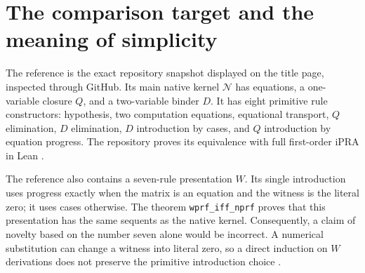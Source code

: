 \documentclass[11pt,a4paper]{article}
\theoremstyle{definition}
\begin{document}
\begin{abstract}
We replace the separate case and equation-induction introductions of the
current native scalar kernel by one introduction. At an equation matrix,
$Q_y E$ means $\forall y(E(y)\to E(Sy))$; at a compound matrix it keeps the
conditional reading $B(0)\to\forall y B(y)$. The corresponding $D$ binds an
existential witness. Elimination specializes a closure along
$I(a,n;u.Su)$, with the source placed in the counter position. Its zero
source computes directly to the arbitrary target $n$, which derives
contextual equation induction without a circular use of an iterator
identity. The new rules admit numerical substitution by direct induction.
Explicit translations preserve derivations in both directions and have
provably identity formula composites for the entire language, not only
guarded public formulas. Numerical domains remain whole and equality
remains actual equality. The written theorem is accompanied by a standalone
typed proof checker, matched old kernels, reproducible size measurements,
and positive and negative certificates. The new metatheorems are not
claimed to have been checked in Lean or Rocq.
\end{abstract}

{\small\tableofcontents}
\newpage
\section{The comparison target and the meaning of simplicity}

The reference is the exact repository snapshot displayed on the title
page, inspected through GitHub. Its main native kernel $\mathcal N$
has equations, a one-variable closure $Q$, and a two-variable binder $D$.
It has eight primitive rule constructors: hypothesis, two computation
equations, equational transport, $Q$ elimination, $D$ elimination,
$D$ introduction by cases, and $Q$ introduction by equation progress.
The repository proves its equivalence with full first-order iPRA in Lean
\cite{baseline,native,bridge}.

The reference also contains a seven-rule presentation $W$.
Its single introduction uses progress exactly when the matrix is an
equation and the witness is the literal zero; it uses cases otherwise.
The theorem \texttt{wprf\_iff\_nprf} proves that this presentation has the
same sequents as the native kernel. Consequently, a claim of novelty
based on the number seven alone would be incorrect. A numerical
substitution can change a witness into literal zero, so a direct induction
on $W$ derivations does not preserve the primitive introduction choice
\cite{witness}.
\end{document}

